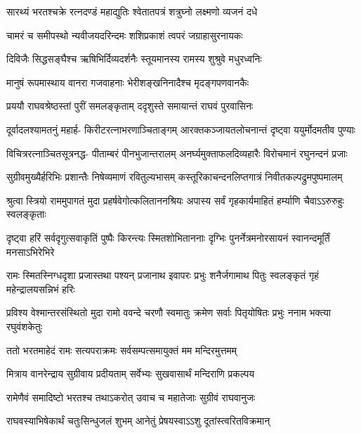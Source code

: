 \twolineshloka
{सारथ्यं भरतश्चक्रे रत्नदण्डं महाद्युतिः}
{श्वेतातपत्रं शत्रुघ्नो लक्ष्मणो व्यजनं दधे} %

\twolineshloka
{चामरं च समीपस्थो न्यवीजयदरिन्दमः}
{शशिप्रकाशं त्वपरं जग्राहासुरनायकः} %

\twolineshloka
{दिविजैः सिद्धसङ्घैश्च ऋषिभिर्दिव्यदर्शनैः}
{स्तूयमानस्य रामस्य शुश्रुवे मधुरध्वनिः} %

\twolineshloka
{मानुषं रूपमास्थाय वानरा गजवाहनाः}
{भेरीशङ्खनिनादैश्च मृदङ्गपणवानकैः} %

\twolineshloka
{प्रययौ राघवश्रेष्ठस्तां पुरीं समलङ्कृताम्}
{ददृशुस्ते समायान्तं राघवं पुरवासिनः} %

\fourlineindentedshloka
{दूर्वादलश्यामतनुं महार्ह-}
{किरीटरत्नाभरणाञ्चिताङ्गम्}
{आरक्तकञ्जायतलोचनान्तं}
{दृष्ट्वा ययुर्मोदमतीव पुण्याः} %

\fourlineindentedshloka
{विचित्ररत्नाञ्चितसूत्रनद्ध-}
{पीताम्बरं पीनभुजान्तरालम्}
{अनर्घ्यमुक्ताफलदिव्यहारैः}
{विरोचमानं रघुनन्दनं प्रजाः} %

\fourlineindentedshloka
{सुग्रीवमुख्यैर्हरिभिः प्रशान्तैः}
{निषेव्यमाणं रवितुल्यभासम्}
{कस्तूरिकाचन्दनलिप्तगात्रं}
{निवीतकल्पद्रुमपुष्पमालम्} %

\fourlineindentedshloka
{श्रुत्वा स्त्रियो राममुपागतं मुदा}
{प्रहर्षवेगोत्कलिताननश्रियः}
{अपास्य सर्वं गृहकार्यमाहितं}
{हर्म्याणि चैवाऽऽरुरुहुः स्वलङ्कृताः} %

\fourlineindentedshloka
{दृष्ट्वा हरिं सर्वदृगुत्सवाकृतिं}
{पुष्पैः किरन्त्यः स्मितशोभिताननाः}
{दृग्भिः पुनर्नेत्रमनोरसायनं}
{स्वानन्दमूर्तिं मनसाऽभिरेभिरे} %

\fourlineindentedshloka
{रामः स्मितस्निग्धदृशा प्रजास्तथा}
{पश्यन् प्रजानाथ इवापरः प्रभुः}
{शनैर्जगामाथ पितुः स्वलङ्कृतं}
{गृहं महेन्द्रालयसन्निभं हरिः} %

\fourlineindentedshloka
{प्रविश्य वेश्मान्तरसंस्थितो मुदा}
{रामो ववन्दे चरणौ स्वमातुः}
{क्रमेण सर्वाः पितृयोषितः प्रभुः}
{ननाम भक्त्या रघुवंशकेतुः} %

\twolineshloka
{ततो भरतमाहेदं रामः सत्यपराक्रमः}
{सर्वसम्पत्समायुक्तं मम मन्दिरमुत्तमम्} %

\twolineshloka
{मित्राय वानरेन्द्राय सुग्रीवाय प्रदीयताम्}
{सर्वेभ्यः सुखवासार्थं मन्दिराणि प्रकल्पय} %

\twolineshloka
{रामेणैवं समादिष्टो भरतश्च तथाऽकरोत्}
{उवाच च महातेजाः सुग्रीवं राघवानुजः} %

\twolineshloka
{राघवस्याभिषेकार्थं चतुःसिन्धुजलं शुभम्}
{आनेतुं प्रेषयस्वाऽऽशु दूतांस्त्वरितविक्रमान्} %

